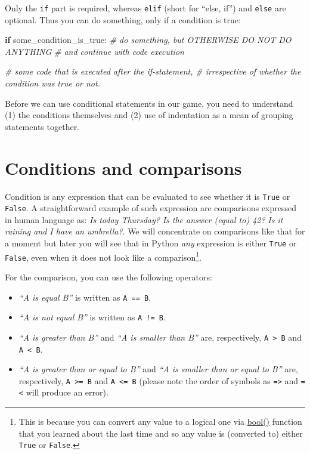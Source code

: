 \documentclass[
]{book}
\newenvironment{Shaded}{\begin{snugshade}}{\end{snugshade}}
\newcommand{\CommentTok}[1]{\textcolor[rgb]{0.56,0.35,0.01}{\textit{#1}}}
\newcommand{\ControlFlowTok}[1]{\textcolor[rgb]{0.13,0.29,0.53}{\textbf{#1}}}
\newcommand{\NormalTok}[1]{#1}
\providecommand{\tightlist}{%
  \setlength{\itemsep}{0pt}\setlength{\parskip}{0pt}}
\begin{document}
Only the \texttt{if} part is required, whereas \texttt{elif} (short for ``else, if'') and \texttt{else} are optional. Thus you can do something, only if a condition is true:

\begin{Shaded}
\begin{Highlighting}[]
\ControlFlowTok{if}\NormalTok{ some\_condition\_is\_true:}
    \CommentTok{\# do something, but OTHERWISE DO NOT DO ANYTHING }
    \CommentTok{\# and continue with code execution}
  
\CommentTok{\# some code that is executed after the if{-}statement,}
\CommentTok{\# irrespective of whether the condition was true or not.}
\end{Highlighting}
\end{Shaded}

Before we can use conditional statements in our game, you need to understand (1) the conditions themselves and (2) use of indentation as a mean of grouping statements together.

\hypertarget{comparisons}{%
\section{Conditions and comparisons}\label{comparisons}}

Condition is any expression that can be evaluated to see whether it is \texttt{True} or \texttt{False}. A straightforward example of such expression are comparisons expressed in human language as: \emph{Is today Thursday?} \emph{Is the answer (equal to) 42?} \emph{Is it raining and I have an umbrella?}. We will concentrate on comparisons like that for a moment but later you will see that in Python \emph{any} expression is either \texttt{True} or \texttt{False}, even when it does not look like a comparison\footnote{This is because you can convert any value to a logical one via \href{https://docs.python.org/3/library/functions.html\#bool}{bool()} function that you learned about the last time and so any value is (converted to) either \texttt{True} or \texttt{False}.}.

For the comparison, you can use the following operators:

\begin{itemize}
\tightlist
\item
  \emph{``A is equal B''} is written as \texttt{A\ ==\ B}.
\item
  \emph{``A is not equal B''} is written as \texttt{A\ !=\ B}.
\item
  \emph{``A is greater than B''} and \emph{``A is smaller than B''} are, respectively, \texttt{A\ \textgreater{}\ B} and \texttt{A\ \textless{}\ B}.
\item
  \emph{``A is greater than or equal to B''} and \emph{``A is smaller than or equal to B''} are, respectively, \texttt{A\ \textgreater{}=\ B} and \texttt{A\ \textless{}=\ B} (please note the order of symbols as \texttt{=\textgreater{}} and \texttt{=\textless{}} will produce an error).
\end{itemize}
\end{document}
